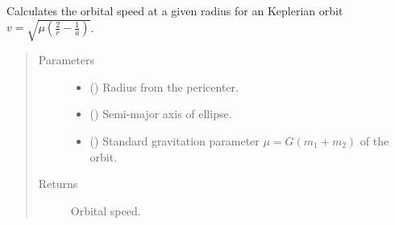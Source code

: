 \documentclass[letterpaper,10pt,english]{sphinxmanual}
\begin{document}
\begin{fulllineitems}
\label{\detokenize{modules/dpt_tools:dpt_tools.orbital_speed}}
Calculates the orbital speed at a given radius for an Keplerian orbit \(v = \sqrt{\mu \left (\frac{2}{r} - \frac{1}{a} \right )}\).
\begin{quote}\begin{description}
\item[{Parameters}] \leavevmode\begin{itemize}
\item {} 
 () \textendash{} Radius from the pericenter.

\item {} 
 () \textendash{} Semi-major axis of ellipse.

\item {} 
 () \textendash{} Standard gravitation parameter \(\mu = G(m_1 + m_2)\) of the orbit.

\end{itemize}

\item[{Returns}] \leavevmode
Orbital speed.

\end{description}\end{quote}

\end{fulllineitems}

\end{document}
